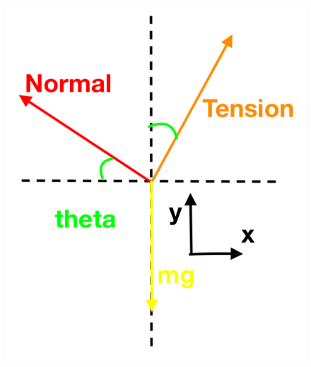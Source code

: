 \documentclass{article}
\begin{document}
\begin{figure}[h]
	\includegraphics[scale=0.30]{P14_FBD}
	\centering
\end{figure}

\end{document}
